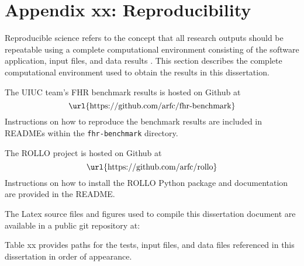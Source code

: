\chapter{Appendix xx: Reproducibility} 

Reproducible science refers to the concept that all research outputs should be 
repeatable using a complete computational environment consisting of the software 
application, input files, and data results \cite{novak_multiscale_2020}.
This section describes the complete computational environment used to obtain the 
results in this dissertation.

The UIUC team's \gls{FHR} benchmark results is hosted on Github at 
\begin{equation*}
\mbox{\url{https://github.com/arfc/fhr-benchmark}}
\end{equation*}
Instructions on how to reproduce the benchmark results are included in READMEs within 
the \texttt{fhr-benchmark} directory. 

The \gls{ROLLO} project is hosted on Github at 
\begin{equation*}
    \mbox{\url{https://github.com/arfc/rollo}}
    \end{equation*}
Instructions on how to install the \gls{ROLLO} Python package and documentation are 
provided in the README. 

The Latex source files and figures used to compile this dissertation document 
are available in a public git repository at: 

Table xx provides paths for the tests, input files, and data files referenced in this 
dissertation in order of appearance. 